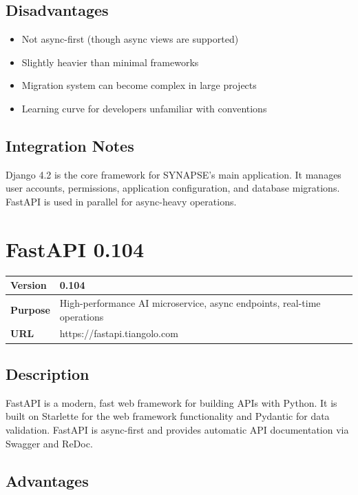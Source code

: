 \documentclass[12pt,a4paper]{report}
\begin{document}
\subsection{Disadvantages}

\begin{itemize}
    \item Not async-first (though async views are supported)
    \item Slightly heavier than minimal frameworks
    \item Migration system can become complex in large projects
    \item Learning curve for developers unfamiliar with conventions
\end{itemize}

\subsection{Integration Notes}

Django 4.2 is the core framework for SYNAPSE's main application. It manages user accounts, permissions, application configuration, and database migrations. FastAPI is used in parallel for async-heavy operations.

\section{FastAPI 0.104}

\begin{tabular}{|p{4cm}|p{10cm}|}
\hline
\textbf{Version} & 0.104 \\
\hline
\textbf{Purpose} & High-performance AI microservice, async endpoints, real-time operations \\
\hline
\textbf{URL} & https://fastapi.tiangolo.com \\
\hline
\end{tabular}

\subsection{Description}

FastAPI is a modern, fast web framework for building APIs with Python. It is built on Starlette for the web framework functionality and Pydantic for data validation. FastAPI is async-first and provides automatic API documentation via Swagger and ReDoc.

\subsection{Advantages}
\end{document}
